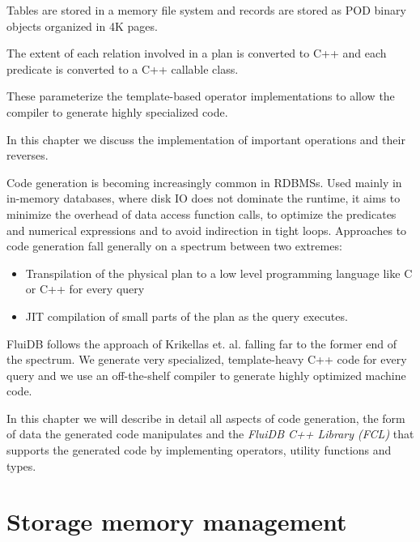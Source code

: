 
\begin{summary}
\item Tables are stored in a memory file system and records are
  stored as POD binary objects organized in 4K pages.
\item The extent of each relation involved in a plan is converted to
  C++  and each predicate is converted to a C++ callable
  class.
\item These parameterize the template-based operator implementations to allow the
  compiler to generate highly specialized code.
\item In this chapter we discuss the implementation of important
  operations and their reverses.
\end{summary}

Code generation is becoming increasingly common in RDBMSs. Used
mainly in in-memory databases, where disk IO does not dominate the
runtime, it aims to minimize the overhead of data access function
calls, to optimize the predicates and numerical expressions and to
avoid indirection in tight loops. Approaches to code generation fall
generally on a spectrum between two extremes:

\begin{itemize}
\item Transpilation of the physical plan to a low level programming
  language like C or C++ for every query
\item JIT compilation of small parts of the plan as the query
  executes.
\end{itemize}

FluiDB follows the approach of Krikellas
et. al. \cite{krikellasGeneratingCodeHolistic2010} falling far to the
former end of the spectrum. We generate very specialized,
template-heavy C++ code for every query and we use an off-the-shelf
compiler to generate highly optimized machine code.

In this chapter we will describe in detail all aspects of code
generation, the form of data the generated code manipulates and the
\emph{FluiDB C++ Library (FCL)} that supports the generated code by
implementing operators, utility functions and types.

\section{Storage memory management}

